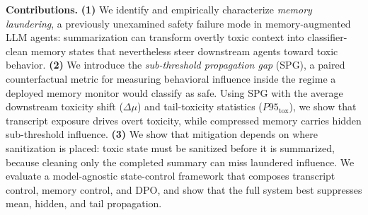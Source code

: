 

\noindent \textbf{Contributions.}
\textbf{(1)} We identify and empirically characterize \emph{memory laundering}, a previously unexamined safety failure mode in memory-augmented LLM agents: summarization can transform overtly toxic context into classifier-clean memory states that nevertheless steer downstream agents toward toxic behavior.
\textbf{(2)} We introduce the \emph{sub-threshold propagation gap} (SPG), a paired counterfactual metric for measuring behavioral influence inside the regime a deployed memory monitor would classify as safe. Using SPG with the average downstream toxicity shift ($\Delta\mu$) and tail-toxicity statistics ($P95_{\text{tox}}$), we show that transcript exposure drives overt toxicity, while compressed memory carries hidden sub-threshold influence.
\textbf{(3)} We show that mitigation depends on where sanitization is placed: toxic state must be sanitized before it is summarized, because cleaning only the completed summary can miss laundered influence. We evaluate a model-agnostic state-control framework that composes transcript control, memory control, and DPO, and show that the full system best suppresses mean, hidden, and tail propagation.



